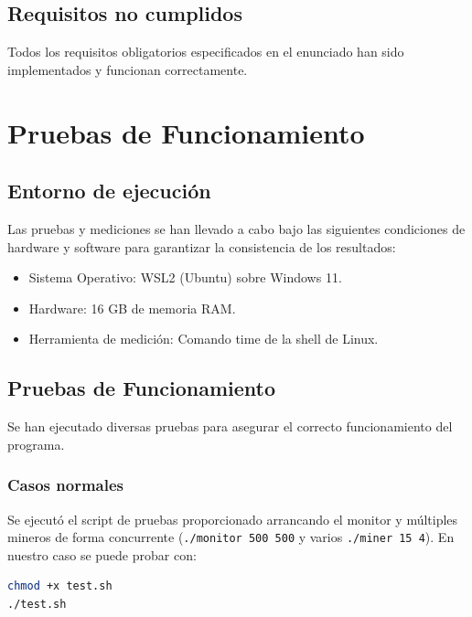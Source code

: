 \documentclass[12pt,a4paper]{article}
\begin{document}
\subsection{Requisitos no cumplidos}
Todos los requisitos obligatorios especificados en el enunciado han sido implementados 
y funcionan correctamente.

\section{Pruebas de Funcionamiento}
\subsection{Entorno de ejecución}
Las pruebas y mediciones se han llevado a cabo bajo las siguientes condiciones de
hardware y software para garantizar la consistencia de los resultados:
\begin{itemize}
    \item Sistema Operativo: WSL2 (Ubuntu) sobre Windows 11.
    \item Hardware: 16 GB de memoria RAM.
    \item Herramienta de medición: Comando time de la shell de Linux.
\end{itemize}

\subsection{Pruebas de Funcionamiento}
Se han ejecutado diversas pruebas para asegurar el correcto funcionamiento del programa.

\subsubsection{Casos normales}
Se ejecutó el script de pruebas proporcionado arrancando el monitor y múltiples mineros de forma concurrente (\texttt{./monitor 500 500} y varios \texttt{./miner 15 4}).
En nuestro caso se puede probar con:
\begin{lstlisting}[language=bash]
chmod +x test.sh
./test.sh
\end{lstlisting}
\end{document}
